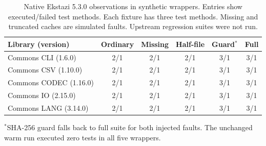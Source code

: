 \begin{table}[t]
\centering
\caption{Native Ekstazi 5.3.0 observations in synthetic wrappers. Entries show executed/failed test methods. Each fixture has three test methods. Missing and truncated caches are simulated faults. Upstream regression suites were not run.}
\label{tab:wrapper-pilot}
\begin{tabular}{lccccc}
\hline
Library (version) & Ordinary & Missing & Half-file & Guard$^*$ & Full \\
\hline
Commons CLI (1.6.0) & 2/1 & 2/1 & 2/1 & 3/1 & 3/1 \\
Commons CSV (1.10.0) & 2/1 & 2/1 & 2/1 & 3/1 & 3/1 \\
Commons CODEC (1.16.0) & 2/1 & 2/1 & 2/1 & 3/1 & 3/1 \\
Commons IO (2.15.0) & 2/1 & 2/1 & 2/1 & 3/1 & 3/1 \\
Commons LANG (3.14.0) & 2/1 & 2/1 & 2/1 & 3/1 & 3/1 \\
\hline
\end{tabular}
\par\smallskip
\footnotesize $^*$SHA-256 guard falls back to full suite for both injected faults. The unchanged warm run executed zero tests in all five wrappers.
\end{table}
